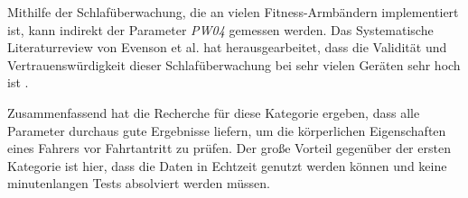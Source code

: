 Mithilfe der Schlafüberwachung, die an vielen Fitness-Armbändern implementiert ist, kann indirekt der Parameter \textit{PW04} gemessen werden. Das Systematische Literaturreview von Evenson et al. hat herausgearbeitet, dass die Validität und Vertrauenswürdigkeit dieser Schlafüberwachung bei sehr vielen Geräten sehr hoch ist \cite{reviewconsumerwearables}.

Zusammenfassend hat die Recherche für diese Kategorie ergeben, dass alle Parameter durchaus gute Ergebnisse liefern, um die körperlichen Eigenschaften eines Fahrers vor Fahrtantritt zu prüfen. Der große Vorteil gegenüber der ersten Kategorie ist hier, dass die Daten in Echtzeit genutzt werden können und keine minutenlangen Tests absolviert werden müssen.
